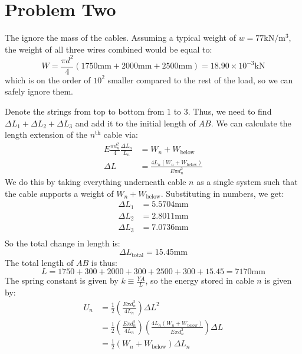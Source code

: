\documentclass{article}
\begin{document}
\newpage
\section{Problem Two}
The ignore the mass of the cables. Assuming a typical weight of $w=77\si{\kilo\newton\per\meter\cubed}$, the weight of all three wires combined would be equal to:
\begin{equation}
    W = \frac{\pi d^2}{4} \left(1750\si{\milli\meter}+2000\si{\milli\meter}+2500\si{\milli\meter}\right) = 18.90 \times 10^{-3} \si{\kilo\newton}
    \label{eq:}
\end{equation}
which is on the order of $10^2$ smaller compared to the rest of the load, so we can safely ignore them.

Denote the strings from top to bottom from $1$ to $3$. Thus, we need to find $\Delta L_1+\Delta L_2+\Delta L_3$ and add it to the initial length of $AB$. We can calculate the length extension of the $n^\text{th}$ cable via:
\begin{align}
    E\frac{\pi d_n^2}{4} \frac{\Delta L_n}{L_n} &= W_n + W_\text{below} \\ 
    \Delta L &= \frac{4L_n(W_n + W_\text{below})}{E\pi d_n^2}
    \label{eq:}
\end{align}
We do this by taking everything underneath cable $n$ as a single system such that the cable supports a weight of $W_n+W_\text{below}$. Substituting in numbers, we get:
\begin{align}
    \Delta L_1 &= 5.5704 \si{\milli\meter}\\ 
    \Delta L_2 &= 2.8011 \si{\milli\meter}\\ 
    \Delta L_3 &= 7.0736 \si{\milli\meter}\\
\end{align}
So the total change in length is:
\begin{equation}
    \Delta L_\text{total} = 15.45\si{\milli\meter}
    \label{eq:}
\end{equation}
The total length of $AB$ is thus:
\begin{equation}
    L = 1750+300+2000+300+2500+300+15.45 = 7170 \si{\milli\meter}
    \label{eq:}
\end{equation}
The spring constant is given by $k\equiv \frac{YA}{L}$, so the energy stored in cable $n$ is given by:
\begin{align}
    U_n &=\frac{1}{2}\left(\frac{E\pi d_n^2}{4L_n}\right)\Delta L^2 \\ 
    &= \frac{1}{2}\left(\frac{E\pi d_n^2}{4L_n}\right)\left(\frac{4L_n(W_n + W_\text{below})}{E\pi d_n^2}\right)\Delta L \\ 
    &= \frac{1}{2}\left(W_n+W_\text{below}\right)\Delta L_n
    \label{eq:}
\end{align}
\end{document}
